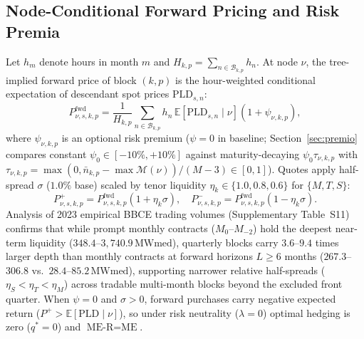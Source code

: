 \documentclass[10pt,journal]{IEEEtran}
\begin{document}
\subsection{Node-Conditional Forward Pricing and Risk Premia}
Let $h_m$ denote hours in month $m$ and $H_{k,p} = \sum_{n \in \mathcal{B}_{k,p}} h_n$. At node $\nu$, the tree-implied forward price of block $(k, p)$ is the hour-weighted conditional expectation of descendant spot prices $\text{PLD}_{s,n}$:
\begin{equation}
P^{\text{fwd}}_{\nu,s,k,p} = \frac{1}{H_{k,p}} \sum_{n \in \mathcal{B}_{k,p}} h_n \, \mathbb{E}\!\left[\text{PLD}_{s,n} \mid \nu\right] (1 + \psi_{\nu,k,p}),
\label{eq:pfwd}
\end{equation}
where $\psi_{\nu,k,p}$ is an optional risk premium ($\psi = 0$ in baseline; Section~\ref{sec:premio} compares constant $\psi_0 \in [-10\%, +10\%]$ against maturity-decaying $\psi_0 \tau_{\nu,k,p}$ with $\tau_{\nu,k,p} = \max(0, \bar{n}_{k,p} - \max \mathcal{M}(\nu))/(M-3) \in [0,1]$). Quotes apply half-spread $\sigma$ ($1.0\%$ base) scaled by tenor liquidity $\eta_k \in \{1.0, 0.8, 0.6\}$ for $\{M, T, S\}$:
\begin{equation}
P^+_{\nu,s,k,p} = P^{\text{fwd}}_{\nu,s,k,p} (1 + \eta_k \sigma), \quad P^-_{\nu,s,k,p} = P^{\text{fwd}}_{\nu,s,k,p} (1 - \eta_k \sigma).
\end{equation}
Analysis of 2023 empirical BBCE trading volumes (Supplementary Table~S11) confirms that while prompt monthly contracts ($M_0$--$M_{-2}$) hold the deepest near-term liquidity ($348.4$--$3,740.9\,\text{MWmed}$), quarterly blocks carry $3.6$--$9.4$ times larger depth than monthly contracts at forward horizons $L \ge 6$ months ($267.3$--$306.8$ vs.\ $28.4$--$85.2\,\text{MWmed}$), supporting narrower relative half-spreads ($\eta_S < \eta_T < \eta_M$) across tradable multi-month blocks beyond the excluded front quarter. When $\psi = 0$ and $\sigma > 0$, forward purchases carry negative expected return ($P^+ > \mathbb{E}[\text{PLD} \mid \nu]$), so under risk neutrality ($\lambda = 0$) optimal hedging is zero ($q^* = 0$) and $\text{ME-R} = \text{ME}$.
\end{document}

